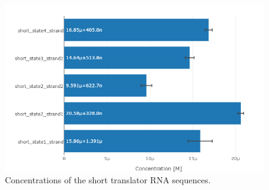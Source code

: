 \begin{figure}[h]
\centering
\includegraphics[width=\columnwidth]{images/translator_transcription_concentration.png}
\caption{Concentrations of the short translator RNA sequences.}
\label{translator_transcription_concentration}
\end{figure}


